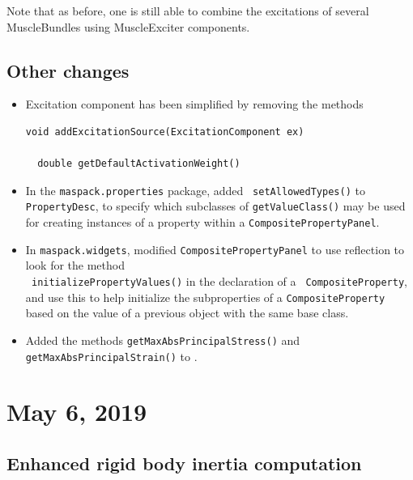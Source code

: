 \documentclass{article}
\begin{document}
Note that as before, one is still able to combine the excitations of
several MuscleBundles using MuscleExciter components.

\subsection*{Other changes}

\begin{itemize}

\item Excitation component has been simplified by removing the methods
%
\begin{lstlisting}[]
  void addExcitationSource(ExcitationComponent ex)

  double getDefaultActivationWeight()
\end{lstlisting}
%

\item In the {\tt maspack.properties} package, added {\tt
setAllowedTypes()} to {\tt PropertyDesc}, to specify which subclasses
of {\tt getValueClass()} may be used for creating instances of a
property within a {\tt CompositePropertyPanel}.

\item In {\tt maspack.widgets}, modified {\tt CompositePropertyPanel}
to use reflection to look for the method \\ {\tt
initializePropertyValues()} in the declaration of a {\tt
CompositeProperty}, and use this to help initialize the subproperties
of a {\tt CompositeProperty} based on the value of a previous
object with the same base class.

\item Added the methods {\tt getMaxAbsPrincipalStress()} and {\tt
getMaxAbsPrincipalStrain()} to
.

\end{itemize}

\section*{May 6, 2019}

\subsection*{Enhanced rigid body inertia computation}
\end{document}
